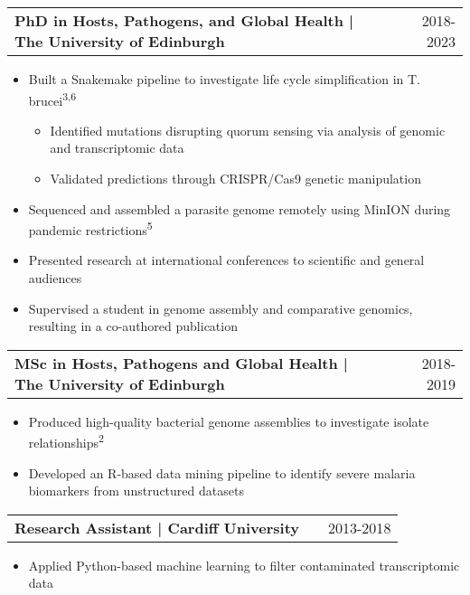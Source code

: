 \documentclass[a4paper,11pt]{article}
\makeatletter
\newenvironment{joblong}[2]{
  \begin{tabularx}{\linewidth}{@{}l X r@{}}
  \textbf{#1} & & #2 \\[2pt]
  \end{tabularx}
  \begin{itemize}[leftmargin=1.2em, itemsep=3pt, label=-]
}{
  \end{itemize}
}
\makeatother
\begin{document}
\begin{joblong}{PhD in Hosts, Pathogens, and Global Health | The University of Edinburgh}{2018-2023}
\item Built a Snakemake pipeline to investigate life cycle simplification in T. brucei\textsuperscript{3,6}
\begin{itemize}[leftmargin=2em, itemsep=2pt, label=$\circ$]
  \item Identified mutations disrupting quorum sensing via analysis of genomic and transcriptomic data 
  \item Validated predictions through CRISPR/Cas9 genetic manipulation
\end{itemize}
\item Sequenced and assembled a parasite genome remotely using MinION during pandemic restrictions\textsuperscript{5}
\item Presented research at international conferences to scientific and general audiences
\item Supervised a student in genome assembly and comparative genomics, resulting in a co-authored publication
\end{joblong}

\begin{joblong}{MSc in Hosts, Pathogens and Global Health | The University of Edinburgh}{2018-2019}
\item Produced high-quality bacterial genome assemblies to investigate isolate relationships\textsuperscript{2}
\item Developed an R-based data mining pipeline to identify severe malaria biomarkers from unstructured datasets
\end{joblong}

\begin{joblong}{Research Assistant | Cardiff University}{2013-2018}
\item Applied Python-based machine learning to filter contaminated transcriptomic data
\end{joblong}

\end{document}
